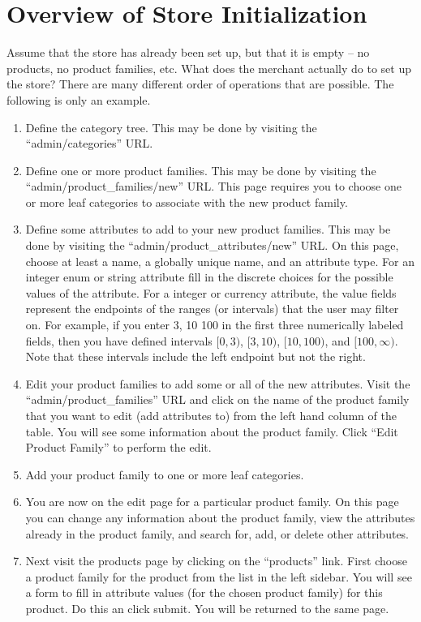 \documentclass[letterpaper, 12pt]{article}
\begin{document}
\section{Overview of Store Initialization}

Assume that the store has already been set up, but that it is empty -- no products, no product families, etc.  What does the merchant actually do to set up the store?  There are many different order of operations that are possible.  The following is only an example.

\begin{enumerate}
\item Define the category tree.  This may be done by visiting the ``admin/categories'' URL.
\item Define one or more product families.  This may be done by visiting the ``admin/product\_families/new'' URL.  This page requires you to choose one or more leaf categories to associate with the new product family.
\item Define some attributes to add to your new product families.  This may be done by visiting the ``admin/product\_attributes/new'' URL.
On this page, choose at least a name, a globally unique name, and an attribute type. For an integer enum or string attribute fill in the discrete choices for the possible values of the attribute.  For a integer or currency attribute, the value fields represent the endpoints of the ranges (or intervals) that the user may filter on.  For example, if you enter 3, 10 100 in the first three numerically labeled fields, then you have defined intervals $[0, 3)$, $[3, 10)$, $[10, 100)$, and $[100, \infty)$.  Note that these intervals include the left endpoint but not the right.
\item Edit your product families to add some or all of the new attributes.  Visit the ``admin/product\_families'' URL and click on the name of the product family that you want to edit (add attributes to) from the left hand column of the table. You will see some information about the product family.  Click ``Edit Product Family'' to perform the edit.
\item Add your product family to one or more leaf categories.
\item You are now on the edit page for a particular product family.  On this page you can change any information about the product family, view the attributes already in the product family, and search for, add, or delete other attributes.
\item Next visit the products page by clicking on the ``products'' link.  First choose a product family for the product from the list in the left sidebar.  You will see a form to fill in attribute values (for the chosen product family) for this product.  Do this an click submit.  You will be returned to the same page.

\end{enumerate}
\end{document}
